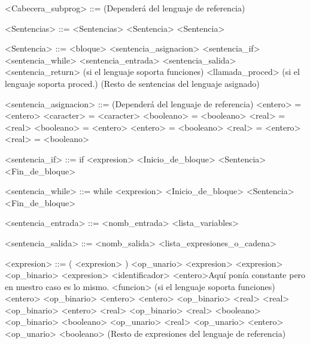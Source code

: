 \documentclass{scrartcl}
\begin{document}
\begin{grammar}
<Cabecera_subprog> ::= (Dependerá del lenguaje de referencia)

<Sentencias> ::= <Sentencias> <Sentencia>
\alt <Sentencia>

<Sentencia> ::= <bloque>
\alt <sentencia_asignacion>
\alt <sentencia_if>
\alt <sentencia_while>
\alt <sentencia_entrada>
\alt <sentencia_salida>
\alt <sentencia_return> (si el lenguaje soporta funciones)
\alt <llamada_proced> (si el lenguaje soporta proced.)
\alt (Resto de sentencias del lenguaje asignado)

<sentencia_asignacion> ::= (Dependerá del lenguaje de referencia)
\alt <entero> = <entero>
\alt <caracter> = <caracter>
\alt <booleano> = <booleano>
\alt <real> = <real>
\alt <booleano> = <entero>
\alt <entero> = <booleano>
\alt <real> = <entero>
\alt <real> = <booleano>

<sentencia_if> ::= if <expresion> <Inicio_de_bloque>
 <Sentencia>
 <Fin_de_bloque>

<sentencia_while> ::= while <expresion> <Inicio_de_bloque>
<Sentencia>
<Fin_de_bloque>

<sentencia_entrada> ::= <nomb_entrada> <lista_variables>

<sentencia_salida> ::= <nomb_salida> <lista_expresiones_o_cadena>

<expresion> ::= ( <expresion> )
\alt <op_unario> <expresion>
\alt <expresion> <op_binario> <expresion>
\alt <identificador>
\alt <entero>Aquí ponía constante pero en nuestro caso es lo mismo.
\alt <funcion> (si el lenguaje soporta funciones)
\alt <entero> <op_binario> <entero>
\alt <entero> <op_binario> <real>
\alt <real> <op_binario> <entero>
\alt <real> <op_binario> <real>
\alt <booleano> <op_binario> <booleano>
\alt <op_unario> <real>
\alt <op_unario> <entero>
\alt <op_unario> <booleano>
\alt (Resto de expresiones del lenguaje de referencia)


\end{grammar}
\end{document}
